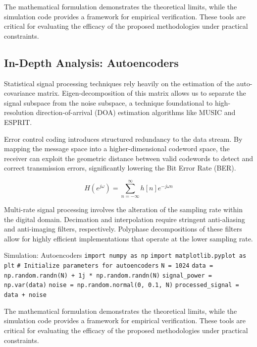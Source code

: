 \vspace{0.5cm}
The mathematical formulation demonstrates the theoretical limits, while the simulation code provides a framework for empirical verification. These tools are critical for evaluating the efficacy of the proposed methodologies under practical constraints.


\subsection{In-Depth Analysis: Autoencoders}
Statistical signal processing techniques rely heavily on the estimation of the auto-covariance matrix. Eigen-decomposition of this matrix allows us to separate the signal subspace from the noise subspace, a technique foundational to high-resolution direction-of-arrival (DOA) estimation algorithms like MUSIC and ESPRIT.

Error control coding introduces structured redundancy to the data stream. By mapping the message space into a higher-dimensional codeword space, the receiver can exploit the geometric distance between valid codewords to detect and correct transmission errors, significantly lowering the Bit Error Rate (BER).

\begin{equation}
    H(e^{j\omega}) = \sum_{n=-\infty}^{\infty} h[n] e^{-j\omega n}
\end{equation}

Multi-rate signal processing involves the alteration of the sampling rate within the digital domain. Decimation and interpolation require stringent anti-aliasing and anti-imaging filters, respectively. Polyphase decompositions of these filters allow for highly efficient implementations that operate at the lower sampling rate.

\begin{pythonbox}{Simulation: Autoencoders}
\texttt{import numpy as np}
\texttt{import matplotlib.pyplot as plt}
\texttt{}
\texttt{\# Initialize parameters for autoencoders}
\texttt{N = 1024}
\texttt{data = np.random.randn(N) + 1j * np.random.randn(N)}
\texttt{signal\_power = np.var(data)}
\texttt{noise = np.random.normal(0, 0.1, N)}
\texttt{processed\_signal = data + noise}
\end{pythonbox}

\vspace{0.5cm}
The mathematical formulation demonstrates the theoretical limits, while the simulation code provides a framework for empirical verification. These tools are critical for evaluating the efficacy of the proposed methodologies under practical constraints.


